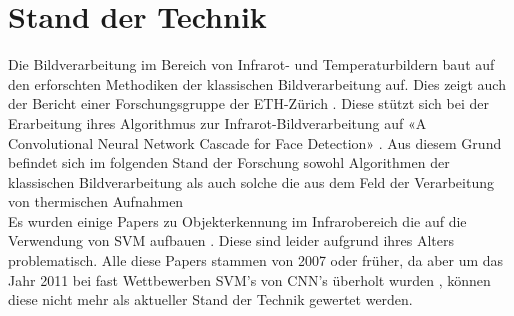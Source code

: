 \chapter{Stand der Technik}
\label{ch:StandDerTechnik}

Die Bildverarbeitung im Bereich von Infrarot- und Temperaturbildern baut auf den erforschten Methodiken der klassischen Bildverarbeitung auf. Dies zeigt auch der Bericht einer Forschungsgruppe der ETH-Zürich\parencite{gomez2018thermal} . Diese stützt sich bei der Erarbeitung ihres Algorithmus zur Infrarot-Bildverarbeitung auf «A Convolutional Neural Network Cascade for Face Detection»\parencite{li2015convolutional} . Aus diesem Grund befindet sich im folgenden Stand der Forschung sowohl Algorithmen der klassischen Bildverarbeitung als auch solche die aus dem Feld der Verarbeitung von thermischen Aufnahmen\\
Es wurden einige Papers zu Objekterkennung im Infrarobereich die auf die Verwendung von \gls{SVM} aufbauen \parencite{suard2006pedestrian, bertozzi2003pedestrian, zhang2007pedestrian}. Diese sind leider aufgrund ihres Alters problematisch. Alle diese Papers stammen von 2007 oder früher, da aber um das Jahr 2011 bei fast Wettbewerben \gls{SVM}'s von \gls{CNN}'s überholt wurden \parencite{Historyo5:online}, können diese nicht mehr als aktueller Stand der Technik gewertet werden.

